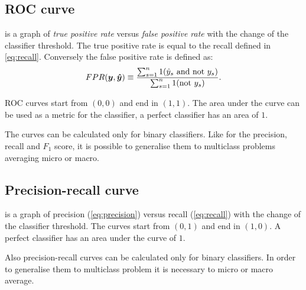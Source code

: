 \subsection{ROC curve} is a graph of \emph{true positive rate} versus
\emph{false positive rate} with the change of the classifier threshold. The
true positive rate is equal to the recall defined in
\cref{eq:recall}. Conversely the false positive rate is defined as:
\begin{equation}\label{eq:fpr}
FPR(\bm{y}, \bm{\hat y}) \equiv \frac{\sum_{s=1}^n 1(\hat
  y_s \text{ and not }y_s)}{\sum_{s=1}^n 1(\text{not }y_s)}.
\end{equation}

ROC curves start from $(0,0)$ and end in $(1,1)$. The area under
the curve can be used as a metric for the classifier, a perfect
classifier has an area of $1$.

The curves can be calculated only for binary classifiers. Like for the
precision, recall and $F_1$ score, it is possible to generalise them to
multiclass problems averaging micro or macro.

\subsection{Precision-recall curve} is a graph of precision
(\cref{eq:precision}) versus 
recall (\cref{eq:recall}) with the change of the classifier
threshold. The curves start from $(0,1)$ and end in $(1,0)$. A perfect
classifier has an area under the curve of $1$.

Also precision-recall curves can be calculated only for binary
classifiers. In order to generalise them to multiclass problem it is
necessary to micro or macro average.




